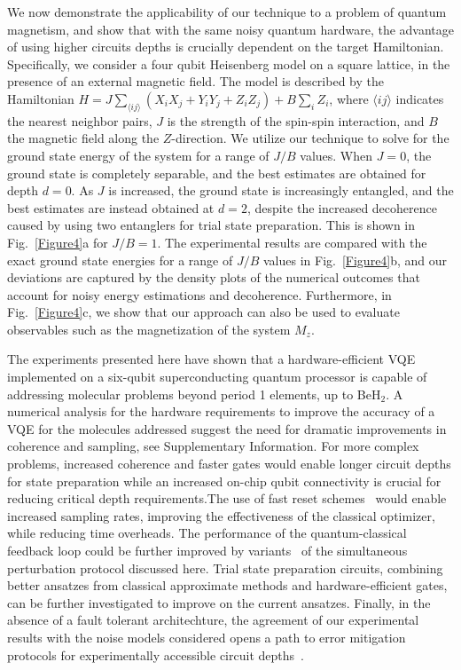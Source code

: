 \documentclass[twocolumn]{revtex4-1}
\newcommand{\1}{\mathbbm{1}}
\begin{document}
We now demonstrate the applicability of our technique to a problem of quantum magnetism, and show that with the same noisy quantum hardware, the advantage of using higher circuits depths is crucially dependent on the target Hamiltonian. Specifically, we consider a four qubit Heisenberg model on a square lattice, in the presence of an external magnetic field. The model is described by the Hamiltonian $H=J\sum_{\langle{ij}\rangle}(X_iX_j+Y_iY_j+Z_iZ_j)+B\sum_{i}Z_i$, where $\langle{ij}\rangle$ indicates the nearest neighbor pairs, $J$ is the strength of the spin-spin interaction, and $B$ the magnetic field along the $Z$-direction. We utilize our technique to solve for the ground state energy of the system for a range of $J/B$ values. When $J=0$, the ground state is completely separable, and the best estimates are obtained for depth $d=$0. As $J$ is increased, the ground state is increasingly entangled, and the best estimates are instead obtained at $d=2$, despite the increased decoherence caused by using two entanglers for trial state preparation. This is shown in Fig.~\ref{Figure4}a for $J/B=1$. The experimental results are compared with the exact ground state energies for a range of $J/B$ values in Fig.~\ref{Figure4}b, and our deviations are captured by the density plots of the numerical outcomes that account for noisy energy estimations and decoherence. Furthermore, in Fig.~\ref{Figure4}c, we show that our approach can also be used to evaluate observables such as the magnetization of the system $M_z$.

The experiments presented here have shown that a hardware-efficient VQE implemented on a six-qubit superconducting quantum processor is capable of addressing molecular problems beyond period 1 elements, up to BeH$_2$. A numerical analysis for the hardware requirements to improve the accuracy of a VQE for the molecules addressed suggest the need for dramatic improvements in coherence and sampling, see Supplementary Information. For more complex problems, increased coherence and faster gates would enable longer circuit depths for state preparation while an increased on-chip qubit connectivity is crucial for reducing critical depth requirements.The use of fast reset schemes~\cite{Bultnick2016} would enable increased sampling rates, improving the effectiveness of the classical optimizer, while reducing time overheads. The performance of the quantum-classical feedback loop could be further improved by variants~\cite{AdaptiveSPSA} of the simultaneous perturbation protocol discussed here. Trial state preparation circuits, combining better ansatzes from classical approximate methods and hardware-efficient gates, can be further investigated to improve on the current ansatzes. Finally, in the absence of a fault tolerant architechture, the agreement of our experimental results with the noise models considered opens a path to error mitigation protocols for experimentally accessible circuit depths~\cite{Mitigation,Mitigation2,Mitigation3}.
\end{document}
